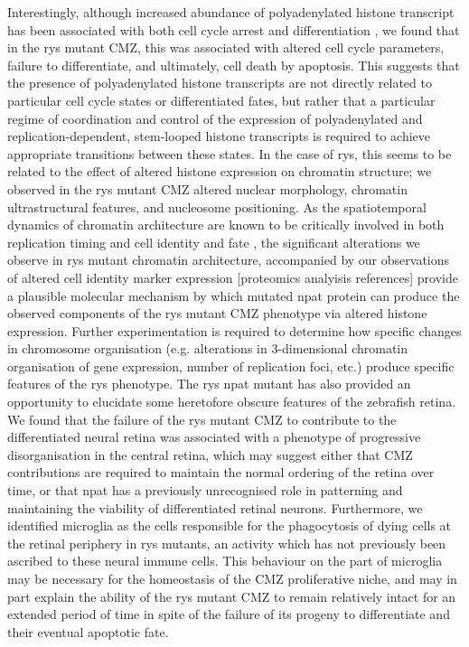 Interestingly, although increased abundance of polyadenylated histone transcript has been associated with both cell cycle arrest and differentiation \cite{Kari2013}, we found that in the rys mutant CMZ, this was associated with altered cell cycle parameters, failure to differentiate, and ultimately, cell death by apoptosis. This suggests that the presence of polyadenylated histone transcripts are not directly related to particular cell cycle states or differentiated fates, but rather that a particular regime of coordination and control of the expression of polyadenylated and replication-dependent, stem-looped histone transcripts is required to achieve appropriate transitions between these states. In the case of rys, this seems to be related to the effect of altered histone expression on chromatin structure; we observed in the rys mutant CMZ altered nuclear morphology, chromatin ultrastructural features, and nucleosome positioning. As the spatiotemporal dynamics of chromatin architecture are known to be critically involved in both replication timing \cite{Gilbert2010} and cell identity and fate \cite{Serrano2013}, the significant alterations we observe in rys mutant chromatin architecture, accompanied by our observations of altered cell identity marker expression [proteomics analyisis references] provide a plausible molecular mechanism by which mutated npat protein can produce the observed components of the rys mutant CMZ phenotype via altered histone expression. Further experimentation is required to determine how specific changes in chromosome organisation (e.g. alterations in 3-dimensional chromatin organisation of gene expression, number of replication foci, etc.) produce specific features of the rys phenotype. 
The rys npat mutant has also provided an opportunity to elucidate some heretofore obscure features of the zebrafish retina. We found that the failure of the rys mutant CMZ to contribute to the differentiated neural retina was associated with a phenotype of progressive disorganisation in the central retina, which may suggest either that CMZ contributions are required to maintain the normal ordering of the retina over time, or that npat has a previously unrecognised role in patterning and maintaining the viability of differentiated retinal neurons. Furthermore, we identified microglia as the cells responsible for the phagocytosis of dying cells at the retinal periphery in rys mutants, an activity which has not previously been ascribed to these neural immune cells. This behaviour on the part of microglia may be necessary for the homeostasis of the CMZ proliferative niche, and may in part explain the ability of the rys mutant CMZ to remain relatively intact for an extended period of time in spite of the failure of its progeny to differentiate and their eventual apoptotic fate. 
